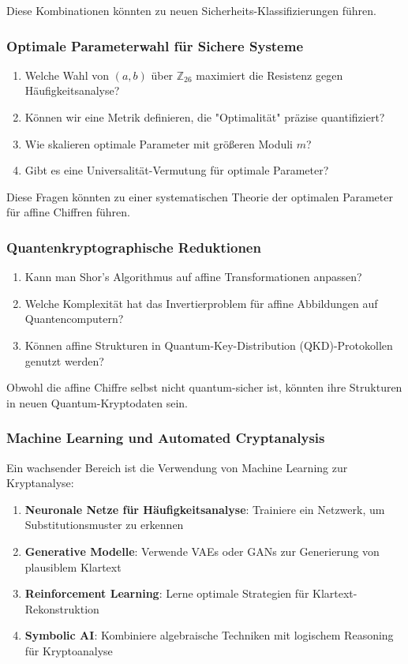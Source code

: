 ﻿\documentclass[12pt,a4paper]{article}
\begin{document}
	Diese Kombinationen könnten zu neuen Sicherheits-Klassifizierungen führen.
	
	\subsubsection{Optimale Parameterwahl für Sichere Systeme}
	
	\begin{enumerate}
		\item Welche Wahl von $(a, b)$ über $\mathbb{Z}_{26}$ maximiert die Resistenz gegen Häufigkeitsanalyse?
		\item Können wir eine Metrik definieren, die "Optimalität" präzise quantifiziert?
		\item Wie skalieren optimale Parameter mit größeren Moduli $m$?
		\item Gibt es eine Universalität-Vermutung für optimale Parameter?
	\end{enumerate}
	
	Diese Fragen könnten zu einer systematischen Theorie der optimalen Parameter für affine Chiffren führen.
	
	\subsubsection{Quantenkryptographische Reduktionen}
	
	\begin{enumerate}
		\item Kann man Shor's Algorithmus auf affine Transformationen anpassen?
		\item Welche Komplexität hat das Invertierproblem für affine Abbildungen auf Quantencomputern?
		\item Können affine Strukturen in Quantum-Key-Distribution (QKD)-Protokollen genutzt werden?
	\end{enumerate}
	
	Obwohl die affine Chiffre selbst nicht quantum-sicher ist, könnten ihre Strukturen in neuen Quantum-Kryptodaten sein.
	
	\subsubsection{Machine Learning und Automated Cryptanalysis}
	
	Ein wachsender Bereich ist die Verwendung von Machine Learning zur Kryptanalyse:
	
	\begin{enumerate}
		\item \textbf{Neuronale Netze für Häufigkeitsanalyse}: Trainiere ein Netzwerk, um Substitutionsmuster zu erkennen
		\item \textbf{Generative Modelle}: Verwende VAEs oder GANs zur Generierung von plausiblem Klartext
		\item \textbf{Reinforcement Learning}: Lerne optimale Strategien für Klartext-Rekonstruktion
		\item \textbf{Symbolic AI}: Kombiniere algebraische Techniken mit logischem Reasoning für Kryptoanalyse
	\end{enumerate}
	
\end{document}
